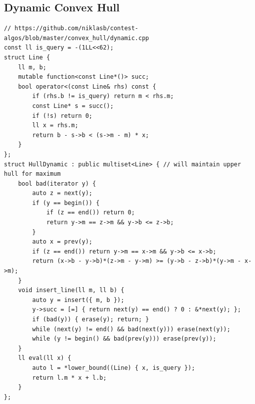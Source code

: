 \documentclass[landscape, 8pt, a4paper, oneside, twocolumn]{extarticle}
\begin{document}
\subsection{Dynamic Convex Hull}
\begin{verbatim}
// https://github.com/niklasb/contest-algos/blob/master/convex_hull/dynamic.cpp
const ll is_query = -(1LL<<62);
struct Line {
    ll m, b;
    mutable function<const Line*()> succ;
    bool operator<(const Line& rhs) const {
        if (rhs.b != is_query) return m < rhs.m;
        const Line* s = succ();
        if (!s) return 0;
        ll x = rhs.m;
        return b - s->b < (s->m - m) * x;
    }
};
struct HullDynamic : public multiset<Line> { // will maintain upper hull for maximum
    bool bad(iterator y) {
        auto z = next(y);
        if (y == begin()) {
            if (z == end()) return 0;
            return y->m == z->m && y->b <= z->b;
        }
        auto x = prev(y);
        if (z == end()) return y->m == x->m && y->b <= x->b;
        return (x->b - y->b)*(z->m - y->m) >= (y->b - z->b)*(y->m - x->m);
    }
    void insert_line(ll m, ll b) {
        auto y = insert({ m, b });
        y->succ = [=] { return next(y) == end() ? 0 : &*next(y); };
        if (bad(y)) { erase(y); return; }
        while (next(y) != end() && bad(next(y))) erase(next(y));
        while (y != begin() && bad(prev(y))) erase(prev(y));
    }
    ll eval(ll x) {
        auto l = *lower_bound((Line) { x, is_query });
        return l.m * x + l.b;
    }
};
\end{verbatim}
\end{document}
